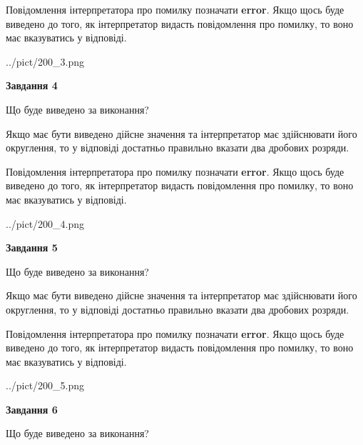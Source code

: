 \documentclass[12pt, ukrainian]{article}
\begin{document}
{\begin {Large}
Повідомлення інтерпретатора про помилку позначати \textbf{error}.
Якщо щось буде виведено до того, як інтерпретатор видасть повідомлення про помилку, 
то воно має вказуватись у відповіді. \par

\begin{center}
	{../pict/200_3.png}
\end{center}
\newpage

{\begin {center}\textbf{Завдання 4}\end {center}}\par
Що буде виведено за виконання? \par

Якщо має бути виведено дійсне значення та інтерпретатор має здійснювати його округлення, 
то у відповіді достатньо правильно вказати два дробових розряди.

Повідомлення інтерпретатора про помилку позначати \textbf{error}.
Якщо щось буде виведено до того, як інтерпретатор видасть повідомлення про помилку, 
то воно має вказуватись у відповіді. \par

\begin{center}
	{../pict/200_4.png}
\end{center}
\newpage

{\begin {center}\textbf{Завдання 5}\end {center}}\par
Що буде виведено за виконання? \par

Якщо має бути виведено дійсне значення та інтерпретатор має здійснювати його округлення, 
то у відповіді достатньо правильно вказати два дробових розряди.

Повідомлення інтерпретатора про помилку позначати \textbf{error}.
Якщо щось буде виведено до того, як інтерпретатор видасть повідомлення про помилку, 
то воно має вказуватись у відповіді. \par

\begin{center}
	{../pict/200_5.png}
\end{center}
\newpage

{\begin {center}\textbf{Завдання 6}\end {center}}\par
Що буде виведено за виконання? \par


\end{Large}}
\end{document}
